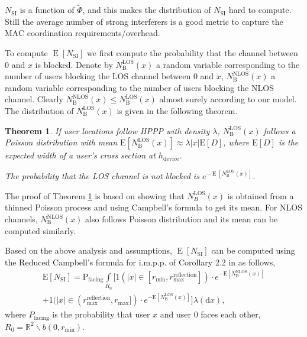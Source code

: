 \documentclass[10pt, conference, letterpaper]{IEEEtran}
\newtheorem{theorem}{Theorem}
\DeclareMathOperator*{\E}{\mathrm{E}}
\DeclareMathOperator*{\LOS}{\mathrm{LOS}}
\DeclareMathOperator*{\NLOS}{\mathrm{NLOS}}
\begin{document}
$N_{\mathrm{SI}}$ is a function of $\tilde{\Phi}$, and this makes the distribution of $N_{\mathrm{SI}}$ hard to compute. 
Still the average number of strong interferers is a good metric to capture the MAC coordination requirements/overhead.


To compute $\E[N_{\mathrm{SI}}]$ we first compute the probability that the channel between $0$ and $x$ is blocked. 
Denote by $N_{\mathrm{B}}^{\LOS}(x)$ a random variable corresponding to the number of users blocking the LOS channel between $0$ and $x$, $N_{\mathrm{B}}^{\NLOS}(x)$ a random variable corresponding to the number of users blocking the NLOS channel. 
Clearly $N_{\mathrm{B}}^{\NLOS}(x)\leq N_{\mathrm{B}}^{\LOS}(x)$ almost surely according to our model.
The distribution of $N_\mathrm{B}^{\LOS}(x)$ is given in the following theorem. 
\begin{theorem}\label{theorem:E_N_B_LOS}
	If user locations follow HPPP with density $\lambda$, $N_\mathrm{B}^\mathrm{LOS}(x)$ follows a Poisson distribution with mean $\mathrm{E}[N_{\mathrm{B}}^\mathrm{LOS}(x)] \approx \lambda |x| \mathrm{E}[D]$, where $\mathrm{E}[D]$ is the expected width of a user's cross section at $h_{\mathrm{device}}$.
	
	The probability that the LOS channel is not blocked is $e^{-\E[N_\mathrm{B}^\mathrm{LOS}(x)]}$.
\end{theorem}

The proof of Theorem \ref{theorem:E_N_B_LOS} is based on showing that $N_B^{\LOS}(x)$ is obtained from a thinned Poisson process \cite{poisson} and using Campbell's formula \cite{stochasticgeometry} to get its mean.
For NLOS channels, $N_{\mathrm{B}}^\mathrm{NLOS}(x)$ also follows Poisson distribution and its mean can be computed similarly.%




Based on the above analysis and assumptions, $\E[N_{\mathrm{SI}}]$ can be computed using the Reduced Campbell's formula for i.m.p.p. of Corollary 2.2 in \cite{stochasticgeometry} as follows,
\begin{multline}\label{eq:E_N_SI}
\mathrm{E}[N_{\mathrm{SI}}] =  \mathrm{P}_{\text{facing}} \int\limits_{R_0} 
 \big[\text{1}(|x|\in[r_{\min},r_{\text{max}}^{\mathrm{reflection}}])
\cdot e^{-\mathrm{E}[N_{\mathrm{B}}^\mathrm{NLOS}(x)]} \\
+ \text{1}(|x|\in(r_{\text{max}}^{\mathrm{reflection}},r_{\text{max}}])
\cdot e^{-\mathrm{E}[N_{\mathrm{B}}^\mathrm{LOS}(x)]} \big]\lambda(\mathrm{d}x),
\end{multline}
where $P_{\text{facing}}$ is the probability that user $x$ and user $0$ faces each other, $R_0 = \mathbb{R}^2\backslash b(0, r_{\min})$.
\end{document}
